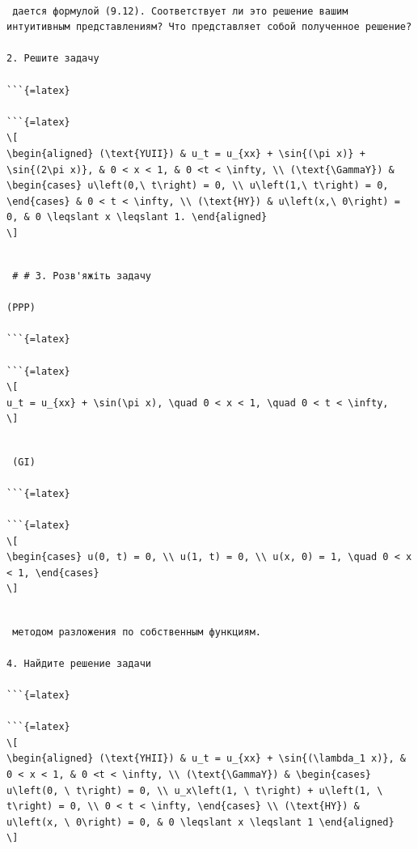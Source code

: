 \documentclass[
  ukrainian,
]{article}
\begin{document}
\begin{verbatim}

 дается формулой (9.12). Соответствует ли это решение вашим интуитивным представлениям? Что представляет собой полученное решение?

2. Решите задачу

```{=latex}

```{=latex}
\[
\begin{aligned} (\text{YUII}) & u_t = u_{xx} + \sin{(\pi x)} + \sin{(2\pi x)}, & 0 < x < 1, & 0 <t < \infty, \\ (\text{\GammaY}) & \begin{cases} u\left(0,\ t\right) = 0, \\ u\left(1,\ t\right) = 0, \end{cases} & 0 < t < \infty, \\ (\text{HY}) & u\left(x,\ 0\right) = 0, & 0 \leqslant x \leqslant 1. \end{aligned}
\]
\end{verbatim}

\begin{verbatim}

 # # 3. Розв'яжіть задачу

(PPP)

```{=latex}

```{=latex}
\[
u_t = u_{xx} + \sin(\pi x), \quad 0 < x < 1, \quad 0 < t < \infty,
\]
\end{verbatim}

\begin{verbatim}

 (GI)

```{=latex}

```{=latex}
\[
\begin{cases} u(0, t) = 0, \\ u(1, t) = 0, \\ u(x, 0) = 1, \quad 0 < x < 1, \end{cases}
\]
\end{verbatim}

\begin{verbatim}

 методом разложения по собственным функциям.

4. Найдите решение задачи

```{=latex}

```{=latex}
\[
\begin{aligned} (\text{YHII}) & u_t = u_{xx} + \sin{(\lambda_1 x)}, & 0 < x < 1, & 0 <t < \infty, \\ (\text{\GammaY}) & \begin{cases} u\left(0, \ t\right) = 0, \\ u_x\left(1, \ t\right) + u\left(1, \ t\right) = 0, \\ 0 < t < \infty, \end{cases} \\ (\text{HY}) & u\left(x, \ 0\right) = 0, & 0 \leqslant x \leqslant 1 \end{aligned}
\]
\end{verbatim}
\end{document}
